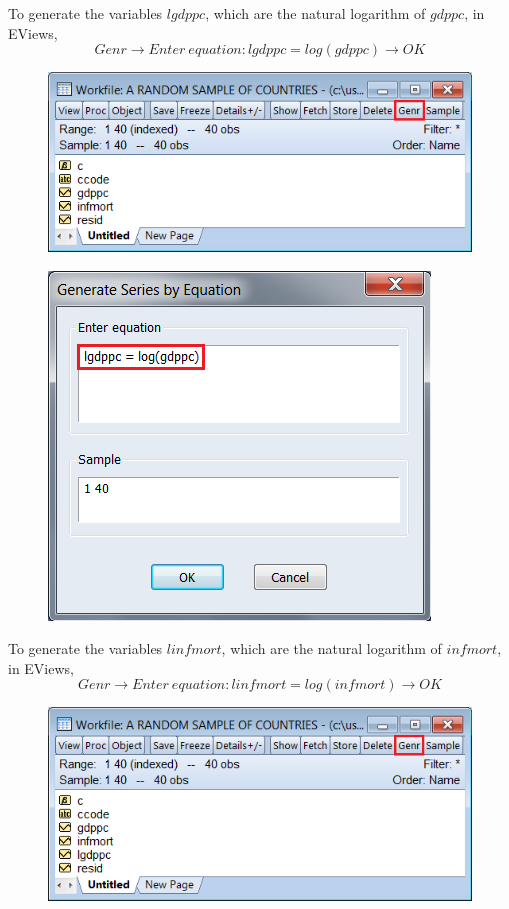 \documentclass[12pt]{report}
\begin{document}
\noindent To generate the variables $lgdppc$, which are the natural logarithm of $gdppc$, in EViews,
$$Genr \to Enter\ equation:lgdppc = log(gdppc) \to OK$$
\begin{figure}[H]
	\centerline{\includegraphics{2018sem2_q1_8}}
\end{figure}
\vspace{-\baselineskip}
\begin{figure}[H]
	\centerline{\includegraphics{2018sem2_q1_9}}
\end{figure}
\vspace{-\baselineskip} \noindent To generate the variables $linfmort$, which are the natural logarithm of  $infmort$, in EViews,
$$Genr \to Enter\ equation:linfmort = log(infmort) \to OK$$
\begin{figure}[H]
	\centerline{\includegraphics{2018sem2_q1_10}}
\end{figure}
\end{document}
